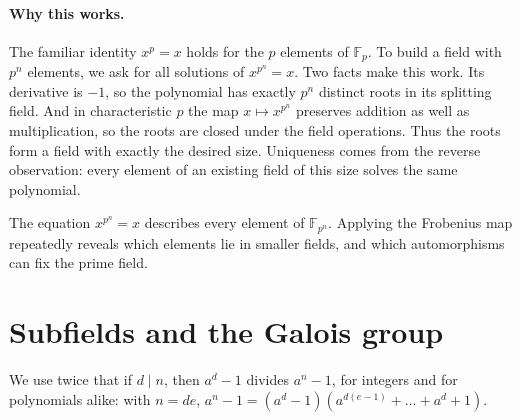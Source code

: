 \paragraph{Why this works.}
The familiar identity $x^p=x$ holds for the $p$ elements of $\mathbb F_p$. To build a field with $p^n$ elements, we ask for all solutions of $x^{p^n}=x$. Two facts make this work. Its derivative is $-1$, so the polynomial has exactly $p^n$ distinct roots in its splitting field. And in characteristic $p$ the map $x\mapsto x^{p^n}$ preserves addition as well as multiplication, so the roots are closed under the field operations. Thus the roots form a field with exactly the desired size. Uniqueness comes from the reverse observation: every element of an existing field of this size solves the same polynomial.

The equation $x^{p^n}=x$ describes every element of $\mathbb F_{p^n}$. Applying the Frobenius map repeatedly reveals which elements lie in smaller fields, and which automorphisms can fix the prime field.

\section{Subfields and the Galois group}

We use twice that if $d\mid n$, then $a^d-1$ divides $a^n-1$, for integers and for polynomials alike: with $n=de$, $a^n-1=(a^d-1)(a^{d(e-1)}+\dots+a^d+1)$.

